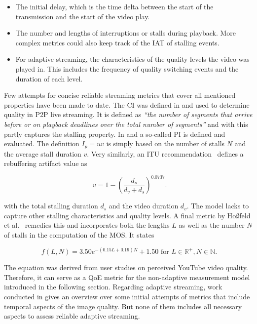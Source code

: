 \begin{itemize}
	\item The initial delay, which is the time delta between the start of the transmission and the start of the video play.

	\item The number and lengths of interruptions or stalls during playback. More complex metrics could also keep track of the \acrshort{IAT} of stalling events.

	\item For adaptive streaming, the characteristics of the quality levels the video was played in. This includes the frequency of quality switching events and the duration of each level.
\end{itemize}

Few attempts for concise reliable streaming metrics that cover all mentioned properties have been made to date. The \gls{CI} was defined in \cite{1498486} and used to determine quality in \gls{P2P} live streaming. It is defined as \textit{\enquote{the number of segments that arrive before or on playback deadlines over the total number of segments}} and with this partly captures the stalling property. In \cite{5634160} and \cite{DBLP:journals/corr/SeyedebrahimiBP13} a so-called \gls{PI} is defined and evaluated. The definition $I_p = uv$ is simply based on the number of stalls $N$ and the average stall duration $v$. Very similarly, an \gls{ITU} recommendation~\cite{ituP1202.1} defines a rebuffering artifact value as 

\begin{equation}
	\phantom{,}v = 1 - ({\frac{d_s}{d_v + d_s}})^{0.0737}\text{.}
\end{equation}

 with the total stalling duration $d_s$ and the video duration $d_v$. The model lacks to capture other stalling characteristics and quality levels. A final metric by Hoßfeld et al.~\cite{hossfeld2013youtubeqoe} remedies this and incorporates both the lengths $L$ as well as the number $N$ of stalls in the computation of the \gls{MOS}. It states

\begin{equation}
	\phantom{.} f(L,N) = 3.50e^{-(0.15L +0.19)N} + 1.50 \text{ for } L \in \mathbb{R}^{+}, N \in \mathbb{N}.
\label{c3:eqn:hossfeld-stalling-model}
\end{equation}

The equation was derived from user studies on perceived YouTube video quality. Therefore, it can serve as a \gls{QoE} metric for the non-adaptive measurement model introduced in the following section. Regarding adaptive streaming, work conducted in \cite{6603210} gives an overview over some initial attempts of metrics that include temporal aspects of the image quality. But none of them includes all necessary aspects to assess reliable adaptive streaming.

